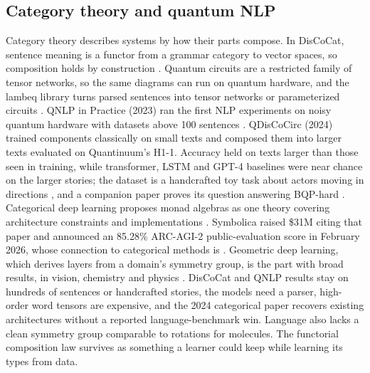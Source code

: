 \subsection{Category theory and quantum NLP}
Category theory describes systems by how their parts compose. In DisCoCat, sentence meaning is a functor from a grammar category to vector spaces, so composition holds by construction \cite{pre25}. Quantum circuits are a restricted family of tensor networks, so the same diagrams can run on quantum hardware, and the lambeq library turns parsed sentences into tensor networks or parameterized circuits \cite{post66}. QNLP in Practice (2023) ran the first NLP experiments on noisy quantum hardware with datasets above 100 sentences \cite{post67}. QDisCoCirc (2024) trained components classically on small texts and composed them into larger texts evaluated on Quantinuum's H1-1. Accuracy held on texts larger than those seen in training, while transformer, LSTM and GPT-4 baselines were near chance on the larger stories; the dataset is a handcrafted toy task about actors moving in directions \cite{post68}, and a companion paper proves its question answering BQP-hard \cite{post71}. Categorical deep learning proposes monad algebras as one theory covering architecture constraints and implementations \cite{post69}. Symbolica raised \$31M citing that paper \cite{post72} and announced an 85.28\% ARC-AGI-2 public-evaluation score in February 2026, whose connection to categorical methods is \unverified{} \cite{post73}. Geometric deep learning, which derives layers from a domain's symmetry group, is the part with broad results, in vision, chemistry and physics \cite{post70}. DisCoCat and QNLP results stay on hundreds of sentences or handcrafted stories, the models need a parser, high-order word tensors are expensive, and the 2024 categorical paper recovers existing architectures without a reported language-benchmark win. Language also lacks a clean symmetry group comparable to rotations for molecules. The functorial composition law survives as something a learner could keep while learning its types from data.

